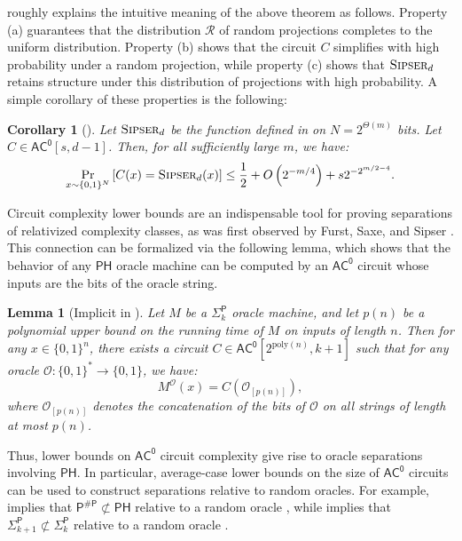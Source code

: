\documentclass[11pt]{article}%
\newtheorem{corollary}[theorem]{Corollary}
\newtheorem{lemma}[theorem]{Lemma}
\newcommand{\poly}{\mathrm{poly}}
\newcommand{\Sipser}{\normalfont\textsc{Sipser}}
\begin{document}
\cite{HRST17} roughly explains the intuitive meaning of the above theorem as follows. Property (a) guarantees that the distribution $\mathcal{R}$ of random projections completes to the uniform distribution. Property (b) shows that the circuit $C$ simplifies with high probability under a random projection, while property (c) shows that $\Sipser_{d}$ retains structure under this distribution of projections with high probability. A simple corollary of these properties is the following:

\begin{corollary}[{\cite[Theorem 10.1]{HRST17}}]
\label{cor:hrst_ac0_depth_hierarchy}
Let $\Sipser_d$ be the function defined in  on $N = 2^{\Theta(m)}$ bits. Let $C \in \mathsf{AC^0}[s, d-1]$. Then, for all sufficiently large $m$, we have:
\[
\Pr_{x \sim \{0,1\}^N}\left[C(x) = \Sipser_d(x)\right] \le \frac{1}{2} + O\left(2^{-m/4}\right) + s2^{-2^{m/2 - 4}}.
\]
\end{corollary}

Circuit complexity lower bounds are an indispensable tool for proving separations of relativized complexity classes, as was first observed by Furst, Saxe, and Sipser \cite{FSS84}. This connection can be formalized via the following lemma, which shows that the behavior of any $\mathsf{PH}$ oracle machine can be computed by an $\mathsf{AC^0}$ circuit whose inputs are the bits of the oracle string.

\begin{lemma}[{Implicit in \cite[Lemma 2.3]{FSS84}}]
\label{lem:furst-saxe-sipser}
Let $M$ be a $\mathsf{\Sigma}_k^{\mathsf{P}}$ oracle machine, and let $p(n)$ be a polynomial upper bound on the running time of $M$ on inputs of length $n$. Then for any $x \in \{0,1\}^n$, there exists a circuit $C \in \mathsf{AC^0}\left[2^{\poly(n)}, k+1\right]$ such that for any oracle $\mathcal{O}: \{0,1\}^* \to \{0,1\}$, we have:
\[
M^\mathcal{O}(x) = C\left(\mathcal{O}_{[p(n)]}\right),
\]
where $\mathcal{O}_{[p(n)]}$ denotes the concatenation of the bits of $\mathcal{O}$ on all strings of length at most $p(n)$.
\end{lemma}

Thus, lower bounds on $\mathsf{AC^0}$ circuit complexity give rise to oracle separations involving $\mathsf{PH}$. In particular, average-case lower bounds on the size of $\mathsf{AC^0}$ circuits can be used to construct separations relative to random oracles. For example,  implies that $\mathsf{P^{\# P}} \not\subset \mathsf{PH}$ relative to a random oracle \cite{Has87}, while  implies that $\mathsf{\Sigma}_{k+1}^\mathsf{P} \not\subset \mathsf{\Sigma}_k^\mathsf{P}$ relative to a random oracle \cite{HRST17,RST15}.
\end{document}
